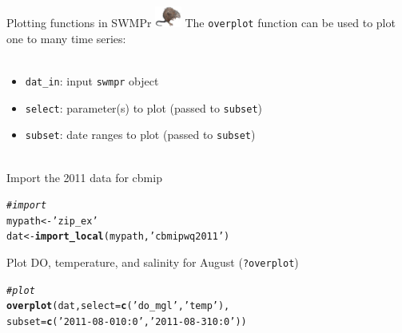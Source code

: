\documentclass[xcolor=dvipsnames,serif]{beamer}\usepackage[]{graphicx}\usepackage[]{color}
\makeatletter
\newcommand{\hlstr}[1]{\textcolor[rgb]{0.192,0.494,0.8}{#1}}%
\newcommand{\hlcom}[1]{\textcolor[rgb]{0.678,0.584,0.686}{\textit{#1}}}%
\newcommand{\hlstd}[1]{\textcolor[rgb]{0.345,0.345,0.345}{#1}}%
\newcommand{\hlkwb}[1]{\textcolor[rgb]{0.69,0.353,0.396}{#1}}%
\newcommand{\hlkwc}[1]{\textcolor[rgb]{0.333,0.667,0.333}{#1}}%
\newcommand{\hlkwd}[1]{\textcolor[rgb]{0.737,0.353,0.396}{\textbf{#1}}}%
\newenvironment{kframe}{%
 \def\at@end@of@kframe{}%
 \ifinner\ifhmode%
  \def\at@end@of@kframe{\end{minipage}}%
  \begin{minipage}{\columnwidth}%
 \fi\fi%
 \def\FrameCommand##1{\hskip\@totalleftmargin \hskip-\fboxsep
 \colorbox{shadecolor}{##1}\hskip-\fboxsep
     \hskip-\linewidth \hskip-\@totalleftmargin \hskip\columnwidth}%
 \MakeFramed {\advance\hsize-\width
   \@totalleftmargin\z@ \linewidth\hsize
   \@setminipage}}%
 {\par\unskip\endMakeFramed%
 \at@end@of@kframe}
\newenvironment{knitrout}{}{} %
\makeatother
\begin{document}
\begin{frame}[fragile, t]{Plotting functions in SWMPr \includegraphics[width = 0.065\textwidth]{imgs/swmprat.png}}
The \texttt{overplot} function can be used to plot one to many time series:\\~\\
\begin{itemize}
\item \texttt{dat_in}: input \texttt{swmpr} object
\item \texttt{select}: parameter(s) to plot (passed to \texttt{subset})
\item \texttt{subset}: date ranges to plot (passed to \texttt{subset})\\~\\
\end{itemize}
Import the 2011 data for cbmip
\begin{knitrout}\scriptsize
{}\color{fgcolor}\begin{kframe}
\begin{alltt}
\hlcom{# import}
\hlstd{mypath} \hlkwb{<-} \hlstr{'zip_ex'}
\hlstd{dat} \hlkwb{<-} \hlkwd{import_local}\hlstd{(mypath,} \hlstr{'cbmipwq2011'}\hlstd{)}
\end{alltt}
\end{kframe}
\end{knitrout}
Plot DO, temperature, and salinity for August (\texttt{?overplot})
\begin{knitrout}\scriptsize
{}\color{fgcolor}\begin{kframe}
\begin{alltt}
\hlcom{# plot}
\hlkwd{overplot}\hlstd{(dat,} \hlkwc{select} \hlstd{=} \hlkwd{c}\hlstd{(}\hlstr{'do_mgl'}\hlstd{,} \hlstr{'temp'}\hlstd{),}
  \hlkwc{subset} \hlstd{=} \hlkwd{c}\hlstd{(}\hlstr{'2011-08-01 0:0'}\hlstd{,} \hlstr{'2011-08-31 0:0'}\hlstd{))}
\end{alltt}
\end{kframe}
\end{knitrout}
\end{frame}
\end{document}
